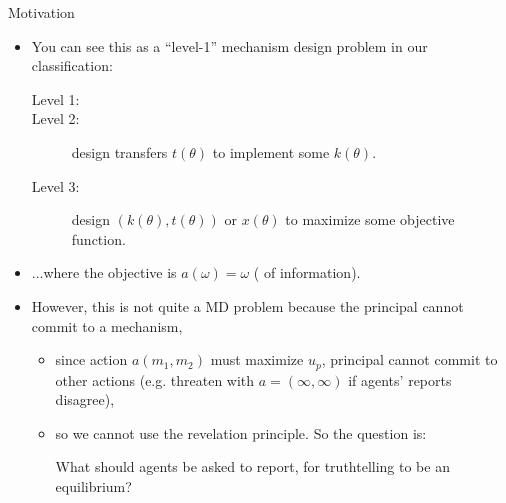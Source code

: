 \documentclass[english,10pt
,aspectratio=169
]{beamer}
\begin{document}
\begin{frame}{Motivation}
	\begin{itemize}
		\item You can see this as a ``level-1'' mechanism design problem in our classification:
		{\footnotesize 
			\begin{description}
				\item[Level 1:] 
				\item[Level 2:] design transfers $t(\theta)$ to implement some $k(\theta)$.
				\item[Level 3:] design $(k(\theta),t(\theta))$ or $x(\theta)$ to maximize some objective function.
			\end{description}
		}
		\item ...where the objective is $a(\omega) = \omega$ ( of information).
		\item However, this is not quite a MD problem because the principal \alert{cannot commit} to a mechanism,
		\begin{itemize}
			\item since action $a(m_1,m_2)$ must maximize $u_p$, principal cannot commit to other actions (e.g. threaten with $a=(\infty,\infty)$ if agents' reports disagree),
			\item so we cannot use the revelation principle. So the question is:
			\begin{block}{}
				\alert{What} should agents be asked to report, for truthtelling to be an equilibrium?
			\end{block}
		\end{itemize}
	\end{itemize}
\end{frame}
\end{document}
